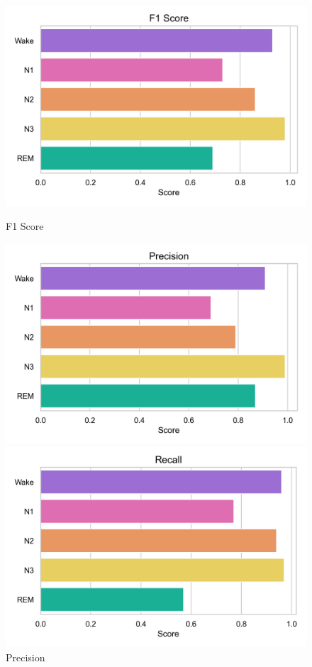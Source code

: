 \begin{figure}[htbp]
	\centering
	\begin{minipage}[b]{0.31\linewidth}
		\includegraphics[width=\linewidth]{img/paper_3/f1_score_plot}
		\caption{F1 Score}
		\label{fig:f1scoreplot}
	\end{minipage}
	\hfill
	\begin{minipage}[b]{0.31\linewidth}
		\includegraphics[width=\linewidth]{img/paper_3/precision_plot}
		\caption{Precision}
		\label{fig:precisionplot}
	\end{minipage}
	\hfill
	\begin{minipage}[b]{0.31\linewidth}
		\includegraphics[width=\linewidth]{img/paper_3/recall_plot}

\end{minipage}
\end{figure}
